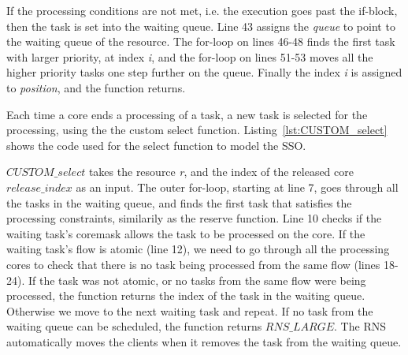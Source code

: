 If the processing conditions are not met, i.e. the execution goes past the if-block, then the task is set into the waiting queue. Line 43 assigns the \emph{queue} to point to the waiting queue of the resource. The for-loop on lines 46-48 finds the first task with larger priority, at index \emph{i}, and the for-loop on lines 51-53 moves all the higher priority tasks one step further on the queue. Finally the index \emph{i} is assigned to \emph{position}, and the function returns.

Each time a core ends a processing of a task, a new task is selected for the processing, using the the custom select function. Listing~\ref{lst:CUSTOM_select} shows the code used for the select function to model the SSO.



$CUSTOM\_select$ takes the resource \emph{r}, and the index of the released core \emph{$release\_index$} as an input. The outer for-loop, starting at line 7, goes through all the tasks in the waiting queue, and finds the first task that satisfies the processing constraints, similarily as the reserve function. Line 10 checks if the waiting task's coremask allows the task to be processed on the core. If the waiting task's flow is atomic (line 12), we need to go through all the processing cores to check that there is no task being processed from the same flow (lines 18-24). If the task was not atomic, or no tasks from the same flow were being processed, the function returns the index of the task in the waiting queue. Otherwise we move to the next waiting task and repeat. If no task from the waiting queue can be scheduled, the function returns $RNS\_LARGE$. The RNS automatically moves the clients when it removes the task from the waiting queue.



